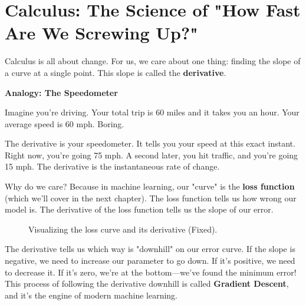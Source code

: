 \documentclass[11pt, letterpaper, openany]{book}
\begin{document}
\section{Calculus: The Science of "How Fast Are We Screwing Up?"}

Calculus is all about change. For us, we care about one thing: finding the slope of a curve at a single point. This slope is called the \textbf{derivative}.

\textbf{Analogy: The Speedometer}

Imagine you're driving. Your total trip is 60 miles and it takes you an hour. Your average speed is 60 mph. Boring.

The derivative is your speedometer. It tells you your speed at this exact instant. Right now, you're going 75 mph. A second later, you hit traffic, and you're going 15 mph. The derivative is the instantaneous rate of change.

Why do we care? Because in machine learning, our "curve" is the \textbf{loss function} (which we'll cover in the next chapter). The loss function tells us how wrong our model is. The derivative of the loss function tells us the slope of our error.

\begin{figure}[h!]
\centering
{}
\caption{Visualizing the loss curve and its derivative (Fixed).}
\end{figure}

The derivative tells us which way is "downhill" on our error curve. If the slope is negative, we need to increase our parameter to go down. If it's positive, we need to decrease it. If it's zero, we're at the bottom—we've found the minimum error! This process of following the derivative downhill is called \textbf{Gradient Descent}, and it's the engine of modern machine learning.
\end{document}
